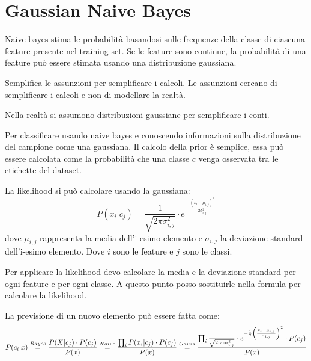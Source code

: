 \section{Gaussian Naive Bayes}
Naive bayes stima le probabilità basandosi sulle frequenze della classe di ciascuna feature presente nel training set. Se le feature sono continue, la probabilità di una feature può essere stimata usando una distribuzione gaussiana.

Semplifica le assunzioni per semplificare i calcoli. Le assunzioni cercano di semplificare i calcoli e non di modellare la realtà.

Nella realtà si assumono distribuzioni gaussiane per semplificare i conti.

Per classificare usando naive bayes e conoscendo informazioni sulla distribuzione del campione come una gaussiana. Il calcolo della prior è semplice, essa può essere calcolata come la probabilità che una classe $c$ venga osservata tra le etichette del dataset.

La likelihood si può calcolare usando la gaussiana:
\begin{equation}
    P(x_i|c_j) = \frac{1}{\sqrt{2 \pi \sigma_{i, j}^2}} \cdot e^{-\frac{(x_i - \mu_{i,j})^2}{2 \sigma_{i,j}^2}}
\end{equation}
dove $\mu_{i, j}$ rappresenta la media dell'i-esimo elemento e $\sigma_{i, j}$ la deviazione standard dell'i-esimo elemento. Dove $i$ sono le feature e $j$ sono le classi.

Per applicare la likelihood devo calcolare la media e la deviazione standard per ogni feature e per ogni classe. A questo punto posso sostituirle nella formula per calcolare la likelihood.

La previsione di un nuovo elemento può essere fatta come: 
\begin{equation*}
    P(c_i | x) \stackrel{Bayes}{=} \frac{P(X | c_j) \cdot P(c_j)}{P(x)} \\ \stackrel{Naive}{=} \frac{\prod_i P(x_i | c_j) \cdot P(c_j)}{P(x)} \\ \stackrel{Gauss}{=} \frac{\prod_i \frac{1}{\sqrt{2\cdot \pi \cdot \sigma_{i, j}^2}} \cdot e^{- \frac{1}{2} \left(\frac{x_i - \mu_{i, j}}{\sigma_{i, j}}\right)^2} \cdot P(c_j)}{P(x)}
\end{equation*}
